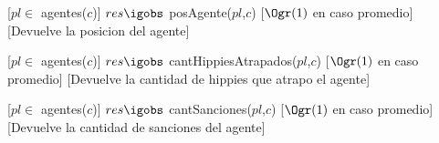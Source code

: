 \begin{Interfaz}
	[$pl \in$ agentes($c$)]
	{$res \igobs$ posAgente($pl$,$c$)}
	[$\Ogr(1)$ en caso promedio]
	[Devuelve la posicion del agente]

	[$pl \in$ agentes($c$)]
	{$res \igobs$ cantHippiesAtrapados($pl$,$c$)}
	[$\Ogr(1)$ en caso promedio]
	[Devuelve la cantidad de hippies que atrapo el agente]

	[$pl \in$ agentes($c$)]
	{$res \igobs$ cantSanciones($pl$,$c$)}
	[$\Ogr(1)$ en caso promedio]
	[Devuelve la cantidad de sanciones del agente]
	

	
\end{Interfaz}

